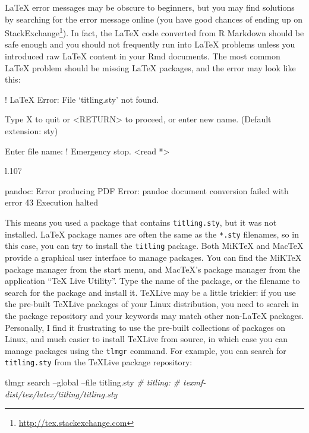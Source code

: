 \documentclass[12pt,]{krantz}
\makeatletter
\newenvironment{Shaded}{\begin{snugshade}}{\end{snugshade}}
\newcommand{\CommentTok}[1]{\textcolor[rgb]{0.56,0.35,0.01}{\textit{#1}}}
\newcommand{\ExtensionTok}[1]{#1}
\newcommand{\NormalTok}[1]{#1}
\renewcommand{\href}[2]{#2\footnote{\url{#1}}}
\newenvironment{kframe}{%
\medskip{}
\setlength{\fboxsep}{.8em}
 \def\at@end@of@kframe{}%
 \ifinner\ifhmode%
  \def\at@end@of@kframe{\end{minipage}}%
  \begin{minipage}{\columnwidth}%
 \fi\fi%
 \def\FrameCommand##1{\hskip\@totalleftmargin \hskip-\fboxsep
 \colorbox{shadecolor}{##1}\hskip-\fboxsep
     \hskip-\linewidth \hskip-\@totalleftmargin \hskip\columnwidth}%
 \MakeFramed {\advance\hsize-\width
   \@totalleftmargin\z@ \linewidth\hsize
   \@setminipage}}%
 {\par\unskip\endMakeFramed%
 \at@end@of@kframe}
\renewenvironment{Shaded}{\begin{kframe}}{\end{kframe}}
\theoremstyle{definition}
\theoremstyle{definition}
\theoremstyle{definition}
\theoremstyle{remark}
\makeatother
\begin{document}
LaTeX error messages may be obscure to beginners, but you may find
solutions by searching for the error message online (you have good
chances of ending up on
\href{http://tex.stackexchange.com}{StackExchange}). In fact, the LaTeX
code converted from R Markdown should be safe enough and you should not
frequently run into LaTeX problems unless you introduced raw LaTeX
content in your Rmd documents. The most common LaTeX problem should be
missing LaTeX packages, and the error may look like this:

\begin{Shaded}
\begin{Highlighting}[]
\NormalTok{! LaTeX Error: File `titling.sty' not found.}

\NormalTok{Type X to quit or <RETURN> to proceed,}
\NormalTok{or enter new name. (Default extension: sty)}

\NormalTok{Enter file name: }
\NormalTok{! Emergency stop.}
\NormalTok{<read *> }
         
\NormalTok{l.107 ^^M}

\NormalTok{pandoc: Error producing PDF}
\NormalTok{Error: pandoc document conversion failed with error 43}
\NormalTok{Execution halted}
\end{Highlighting}
\end{Shaded}

This means you used a package that contains \texttt{titling.sty}, but it
was not installed. LaTeX package names are often the same as the
\texttt{*.sty} filenames, so in this case, you can try to install the
\texttt{titling} package. Both MiKTeX and MacTeX provide a graphical
user interface to manage packages. You can find the MiKTeX package
manager from the start menu, and MacTeX's package manager from the
application ``TeX Live Utility''. Type the name of the package, or the
filename to search for the package and install it. TeXLive may be a
little trickier: if you use the pre-built TeXLive packages of your Linux
distribution, you need to search in the package repository and your
keywords may match other non-LaTeX packages. Personally, I find it
frustrating to use the pre-built collections of packages on Linux, and
much easier to install TeXLive from source, in which case you can manage
packages using the \texttt{tlmgr} command. For example, you can search
for \texttt{titling.sty} from the TeXLive package repository:

\begin{Shaded}
\begin{Highlighting}[]
\ExtensionTok{tlmgr}\NormalTok{ search --global --file titling.sty}
\CommentTok{# titling:}
\CommentTok{#    texmf-dist/tex/latex/titling/titling.sty}
\end{Highlighting}
\end{Shaded}
\end{document}
